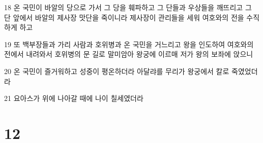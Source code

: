 \par 18 온 국민이 바알의 당으로 가서 그 당을 훼파하고 그 단들과 우상들을 깨뜨리고 그 단 앞에서 바알의 제사장 맛단을 죽이니라 제사장이 관리들을 세워 여호와의 전을 수직하게 하고
\par 19 또 백부장들과 가리 사람과 호위병과 온 국민을 거느리고 왕을 인도하여 여호와의 전에서 내려와서 호위병의 문 길로 말미암아 왕궁에 이르매 저가 왕의 보좌에 앉으니
\par 20 온 국민이 즐거워하고 성중이 평온하더라 아달랴를 무리가 왕궁에서 칼로 죽였었더라
\par 21 요아스가 위에 나아갈 때에 나이 칠세였더라

\chapter{12}

